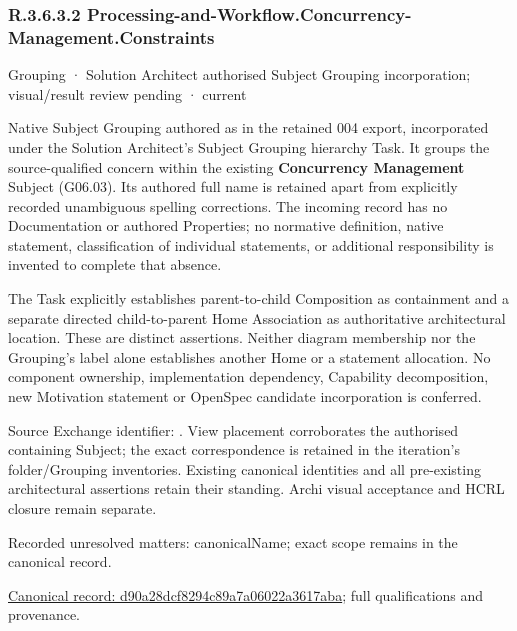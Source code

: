 \subsubsection*{R.3.6.3.2 Processing-and-Workflow.Concurrency-Management.Constraints}
\label{navigation:R.3.6.3.2}

\label{element:d90a28dcf8294c89a7a06022a3617aba}
{\small Grouping · Solution Architect authorised Subject Grouping incorporation; visual/result review pending · current}\par

Native Subject Grouping authored as \texttt{} in the retained 004 export,
incorporated under the Solution Architect's Subject Grouping hierarchy Task.
It groups the source-qualified \texttt{} concern within
the existing \textbf{Concurrency Management} Subject (G06.03). Its authored full name
is retained apart from explicitly recorded unambiguous spelling corrections.
The incoming record has no Documentation or authored Properties; no normative
definition, native statement, classification of individual statements, or
additional responsibility is invented to complete that absence.



The Task explicitly establishes parent-to-child Composition as containment and
a separate directed child-to-parent Home Association as authoritative architectural
location. These are distinct assertions. Neither diagram membership nor the
Grouping's label alone establishes another Home or a statement allocation.
No component ownership, implementation dependency, Capability decomposition,
new Motivation statement or OpenSpec candidate incorporation is conferred.



Source Exchange identifier: \texttt{}. View placement corroborates
the authorised containing Subject; the exact correspondence is retained in the
iteration's folder/Grouping inventories. Existing canonical identities and all
pre-existing architectural assertions retain their standing. Archi visual
acceptance and HCRL closure remain separate.


{\small Recorded unresolved matters: canonicalName; exact scope remains in the canonical record.}\par
{\footnotesize \href{../../../../continuum/grouping/d90a28dcf8294c89a7a06022a3617aba.md}{Canonical record: d90a28dcf8294c89a7a06022a3617aba}; full qualifications and provenance.}\par
